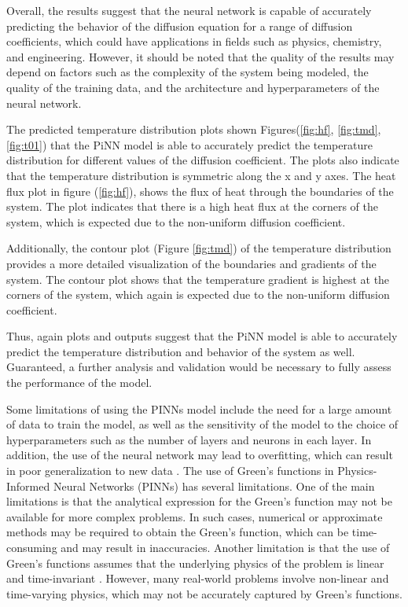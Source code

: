 Overall, the results suggest that the neural network is capable of accurately predicting the behavior of the diffusion equation for a range of diffusion coefficients, which could have applications in fields such as physics, chemistry, and engineering. However, it should be noted that the quality of the results may depend on factors such as the complexity of the system being modeled, the quality of the training data, and the architecture and hyperparameters of the neural network.

The predicted temperature distribution plots shown Figures(\ref{fig:hf}, \ref{fig:tmd}, \ref{fig:t01}) that the PiNN model is able to accurately predict the temperature distribution for different values of the diffusion coefficient. The plots also indicate that the temperature distribution is symmetric along the x and y axes. The heat flux plot in figure (\ref{fig:hf}), shows the flux of heat through the boundaries of the system. The plot indicates that there is a high heat flux at the corners of the system, which is expected due to the non-uniform diffusion coefficient.

Additionally, the contour plot (Figure \ref{fig:tmd}) of the temperature distribution provides a more detailed visualization of the boundaries and gradients of the system. The contour plot shows that the temperature gradient is highest at the corners of the system, which again is expected due to the non-uniform diffusion coefficient.

Thus, again plots and outputs suggest that the PiNN model is able to accurately predict the temperature distribution and behavior of the system as well. Guaranteed, a further analysis and validation would be necessary to fully assess the performance of the model.

Some limitations of using the PINNs model include the need for a large amount of data to train the model, as well as the sensitivity of the model to the choice of hyperparameters such as the number of layers and neurons in each layer. In addition, the use of the neural network may lead to overfitting, which can result in poor generalization to new data \cite{Hassan2017}. The use of Green's functions in Physics-Informed Neural Networks (PINNs) has several limitations. One of the main limitations is that the analytical expression for the Green's function may not be available for more complex problems. In such cases, numerical or approximate methods may be required to obtain the Green's function, which can be time-consuming and may result in inaccuracies. Another limitation is that the use of Green's functions assumes that the underlying physics of the problem is linear and time-invariant \cite{Skinner}. However, many real-world problems involve non-linear and time-varying physics, which may not be accurately captured by Green's functions.


